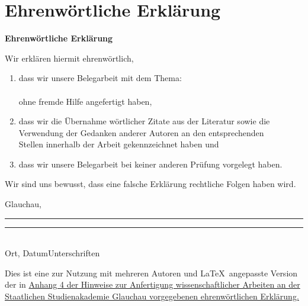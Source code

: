 

\cleardoublepage 
\section{Ehrenwörtliche Erklärung}
\vspace*{1cm}
\begin{center}
\huge\textbf{Ehrenwörtliche Erklärung}\\
\end{center}
\vspace*{1cm}
\normalsize
Wir erklären hiermit ehrenwörtlich,

\begin{enumerate}
	\vspace{1cm}
	\item dass wir unsere Belegarbeit mit dem Thema:\\
	
	\textbf{\titel }\\

	ohne fremde Hilfe angefertigt haben,
	\item dass wir die Übernahme wörtlicher Zitate aus der Literatur sowie die\\ 		  
	Verwendung der Gedanken anderer Autoren an den entsprechenden\\
	Stellen innerhalb der Arbeit gekennzeichnet haben und
	\item dass wir unsere Belegarbeit bei keiner anderen Prüfung vorgelegt haben.\\[1,5cm]
\end{enumerate}
Wir sind uns bewusst, dass eine falsche Erklärung rechtliche Folgen haben wird.\\[1,5cm]
		
\vspace*{20mm}

\absatz
Glauchau, \abgabedatum
\par\noindent\rule{0.35\columnwidth}{0.4pt}\hspace{0.05\columnwidth}\rule{0.6\columnwidth}{0.4pt}\\
Ort, Datum\hspace{0.27\columnwidth}Unterschriften

\vfill

\absatz
{\footnotesize Dies ist eine zur Nutzung mit mehreren Autoren und \LaTeX\ angepasste Version der in \href{https://www.ba-glauchau.de/fileadmin/glauchau/waehrend-des-studium/dokumente/pruefungen/4BA-F.207_Hinweise_zur_Anfertigung_wissenschaftlicher_Arbeiten.pdf}{Anhang 4 der Hinweise zur Anfertigung wissenschaftlicher Arbeiten an der Staatlichen Studienakademie Glauchau vorgegebenen ehrenwörtlichen Erklärung.}}


